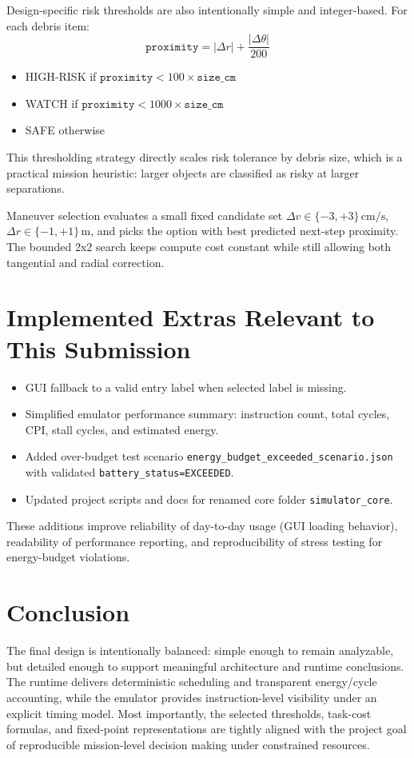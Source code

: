 \documentclass[11pt,a4paper]{article}
\begin{document}
Design-specific risk thresholds are also intentionally simple and integer-based. For each debris item:
\begin{equation}
\texttt{proximity} = |\Delta r| + \frac{|\Delta \theta|}{200}
\end{equation}
\begin{itemize}[leftmargin=1.5em]
    \item HIGH-RISK if \(\texttt{proximity} < 100 \times \texttt{size\_cm}\)
    \item WATCH if \(\texttt{proximity} < 1000 \times \texttt{size\_cm}\)
    \item SAFE otherwise
\end{itemize}

This thresholding strategy directly scales risk tolerance by debris size, which is a practical mission heuristic: larger objects are classified as risky at larger separations.

Maneuver selection evaluates a small fixed candidate set
\(\Delta v\in\{-3,+3\}\,\text{cm/s}\),
\(\Delta r\in\{-1,+1\}\,\text{m}\),
and picks the option with best predicted next-step proximity.
The bounded 2x2 search keeps compute cost constant while still allowing both tangential and radial correction.

\section{Implemented Extras Relevant to This Submission}
\begin{itemize}[leftmargin=1.5em]
    \item GUI fallback to a valid entry label when selected label is missing.
    \item Simplified emulator performance summary: instruction count, total cycles, CPI, stall cycles, and estimated energy.
    \item Added over-budget test scenario \texttt{energy\_budget\_exceeded\_scenario.json} with validated \texttt{battery\_status=EXCEEDED}.
    \item Updated project scripts and docs for renamed core folder \texttt{simulator\_core}.
\end{itemize}
These additions improve reliability of day-to-day usage (GUI loading behavior), readability of performance reporting, and reproducibility of stress testing for energy-budget violations.

\section{Conclusion}
The final design is intentionally balanced: simple enough to remain analyzable, but detailed enough to support meaningful architecture and runtime conclusions. The runtime delivers deterministic scheduling and transparent energy/cycle accounting, while the emulator provides instruction-level visibility under an explicit timing model. Most importantly, the selected thresholds, task-cost formulas, and fixed-point representations are tightly aligned with the project goal of reproducible mission-level decision making under constrained resources.
\end{document}
